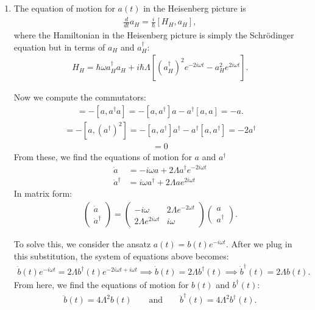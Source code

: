 \documentclass{article}
\theoremstyle{definition}
\newcommand{\f}[2]{\frac{#1}{#2}}
\newcommand{\lb}{\left[}
\newcommand{\rb}{\right]}
\begin{document}
\begin{enumerate}[label=(\alph*)]

\item The equation of motion for $a(t)$ in the Heisenberg picture is 
\begin{align*}
\f{d}{dt}a_H = \f{i}{\hbar} [H_H, a_H],
\end{align*}
where the Hamiltonian in the Heisenberg picture is simply the Schr\"{o}dinger equation but in terms of $a_H$ and $a_H^\dagger$:
\begin{align*}
H_H =  \hbar \omega a_H^\dagger a_H + i\hbar \Lambda \lb (a_H^\dagger)^2 e^{-2i\omega t}  - a_H^2 e^{2i\omega t} \rb.
\end{align*}


Now we compute the commutators:
\begin{align*}
[a^\dagger a , a] = -[a,a^\dagger a] = -[a,a^\dagger] a - a^\dagger [a,a] = -a.
\end{align*}
\begin{align*}
[(a^\dagger)^2, a] = -[a,(a^\dagger)^2] = -[a,a^\dagger]a^\dagger - a^\dagger [a, a^\dagger] = -2a^\dagger
\end{align*}
 \begin{align*}
 [a^2,a] = 0
\end{align*}
From these, we find the equations of motion for $a$ and $a^\dagger$
\begin{align*}
\dot a
&=  -i \omega a + 2 \Lambda a^\dagger  e^{-2i\omega t} \\
\dot a^\dagger
&= i \omega a^\dagger + 2\Lambda a  e^{2i\omega t}
\end{align*}
In matrix form:
\begin{align*}
\begin{pmatrix} 
\dot a \\ \dot a^\dagger
\end{pmatrix}
=
\begin{pmatrix}
-i\omega & 2\Lambda e^{-2\omega t} \\ 2\Lambda e^{2i\omega t} & i \omega 
\end{pmatrix}
\begin{pmatrix}
a \\ a^\dagger
\end{pmatrix}.
\end{align*}

To solve this, we consider the ansatz $a(t) = b(t)e^{-i\omega t}$. After we plug in this substitution, the system of equations above becomes:
\begin{align*}
\dot{b}(t) e^{-i\omega t} = 2\Lambda b^\dagger(t) e^{-2i\omega t + i\omega t} \implies \dot{b}(t) = 2\Lambda b^\dagger(t) \implies \dot{b}^\dagger(t) = 2\Lambda b(t).
\end{align*}
From here, we find the equations of motion for $b(t)$ and $b^\dagger(t)$: 
\begin{align*}
\ddot{b}(t) = 4\Lambda^2 b(t) \quad\quad \text{and} \quad\quad \ddot{b}^\dagger(t) = 4\Lambda^2 b^\dagger(t).
\end{align*}




\end{enumerate}
\end{document}
